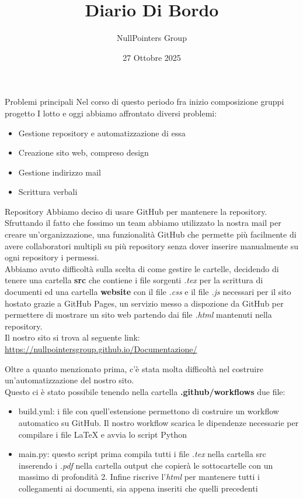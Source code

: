 \documentclass[11pt]{beamer}
\author{NullPointers Group}
\title{Diario Di Bordo}
\institute{Università di Padova}
\date{27 Ottobre 2025}
\renewcommand{\emph}[1]{\textbf{#1}}
\begin{document}
\begin{frame}
\titlepage
\end{frame}

\begin{frame}{Problemi principali}
	Nel corso di questo periodo fra inizio composizione gruppi progetto I lotto e oggi abbiamo affrontato diversi problemi:
	\begin{itemize}
		\item Gestione repository e automatizzazione di essa
		\item Creazione sito web, compreso design
		\item Gestione indirizzo mail
		\item Scrittura verbali
	\end{itemize}
\end{frame}

\begin{frame}{Repository}
	Abbiamo deciso di usare GitHub per mantenere la repository. \\
	Sfruttando il fatto che fossimo un team abbiamo utilizzato la nostra mail per creare un'organizzazione, una funzionalità GitHub che permette più facilmente di avere collaboratori multipli su più repository senza dover inserire manualmente su ogni repository i permessi.\\
	Abbiamo avuto difficoltà sulla scelta di come gestire le cartelle, decidendo di tenere una cartella \emph{src} che contiene i file sorgenti \textit{.tex} per la scrittura di documenti ed una cartella \emph{website} con il file \textit{.css} e il file \textit{.js} necessari per il sito hostato grazie a GitHub Pages, un servizio messo a dispozione da GitHub per permettere di mostrare un sito web partendo dai file \textit{.html} mantenuti nella repository. \\
	Il nostro sito si trova al seguente link: \url{https://nullpointersgroup.github.io/Documentazione/}
\end{frame}

\begin{frame}
	Oltre a quanto menzionato prima, c'è stata molta difficoltà nel costruire un'automatizzazione del nostro sito.\\
	Questo ci è stato possibile tenendo nella cartella \emph{.github/workflows} due file: 
	\begin{itemize}
		\item build.yml: i file con quell'estensione permettono di costruire un workflow automatico su GitHub. Il nostro workflow scarica le dipendenze necessarie per compilare i file LaTeX e avvia lo script Python
		\item main.py: questo script prima compila tutti i file \textit{.tex} nella cartella src inserendo i \textit{.pdf} nella cartella output che copierà le sottocartelle con un massimo di profondità 2. Infine riscrive l'\textit{html} per mantenere tutti i collegamenti ai documenti, sia appena inseriti che quelli precedenti
	\end{itemize}
\end{frame}
\end{document}
